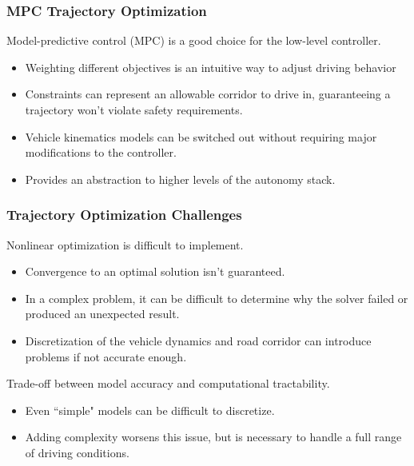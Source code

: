 \documentclass{beamer}
\begin{document}
\begin{frame}
\frametitle{MPC Trajectory Optimization}
Model-predictive control (MPC) is a good choice for the low-level controller.
\begin{itemize}
\item Weighting different objectives is an intuitive way to adjust driving behavior
\item Constraints can represent an allowable corridor to drive in, guaranteeing a trajectory won't violate safety requirements.
\item Vehicle kinematics models can be switched out without requiring major modifications to the controller.
\item Provides an abstraction to higher levels of the autonomy stack.
\end{itemize}


\end{frame}

\begin{frame}
\frametitle{Trajectory Optimization Challenges}
Nonlinear optimization is difficult to implement.
\begin{itemize}
	\item Convergence to an optimal solution isn't guaranteed.
	\item In a complex problem, it can be difficult to determine why the solver failed or produced an unexpected result.
	\item Discretization of the vehicle dynamics and road corridor can introduce problems if not accurate enough.
\end{itemize}

Trade-off between model accuracy and computational tractability.
\begin{itemize}
	\item Even ``simple" models can be difficult to discretize.
	\item Adding complexity worsens this issue, but is necessary to handle a full range of driving conditions.%
\end{itemize}
\end{frame}
\end{document}
